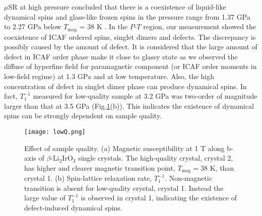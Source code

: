 $\mu$SR at high pressure concluded that there is a coexistence of liquid-like dynamical spins and glass-like frozen spins
in the pressure range from 1.37 GPa to 2.27 GPa below $T_{\mathrm{mag}}$ = 38 K \cite{Majumder2018}.
In the $P$-$T$ region, our measurement showed the coexistence of ICAF ordered spins, singlet dimers and defects.
The discrepancy is possibly caused by the amount of defect.
It is considered that the large amount of defect in ICAF order phase make it close to glassy state
as we observed the diffuse of hyperfine field for paramagnetic component (or ICAF order moments in low-field regime) at 1.3 GPa and at low temperature.
Also, the high concentration of defect in singlet dimer phase can produce dynamical spins.
In fact, $T^{-1}_1$ measured for low-quality sample at 3.2 GPa was two-order of magnitude larger than that at 3.5 GPa (Fig.\ref{lowQ}(b)).
This indicates the existence of dynamical spins can be strongly dependent on sample quality.

\begin{figure}[H]
  \centering
  \texttt{[image: lowQ.png]}
  \caption{Effect of sample quality.
  (a) Magnetic susceptibility at 1 T along b-axis of $\beta$-Li$_2$IrO$_3$ single crystals.
  The high-quality crystal, crystal 2, has higher and clearer magnetic transition point, $T_\mathrm{mag} = 38$ K, than crystal 1.
  (b) Spin-lattice relaxation rate, $T^{-1}_1$.
  Non-magnetic transition is absent for low-quality crystal, crystal 1.
  Instead the large value of $T^{-1}_1$ is observed in crystal 1, indicating the existence of defect-induced dynamical spins.}
  \label{lowQ}
\end{figure}


